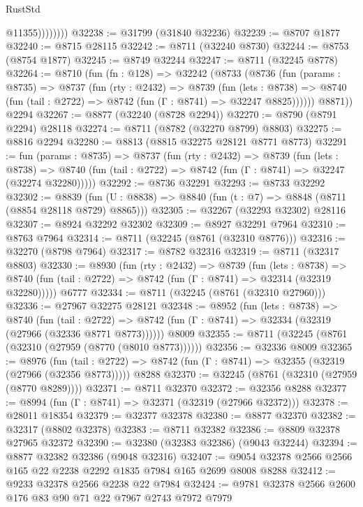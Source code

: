 \begin{lexlean}{RustStd}
\begin{coremodule}
                    @11355))))))))
@32238 := @31799 (@31840 @32236)
@32239 := @8707 @1877
@32240 := @8715 @28115
@32242 := @8711 (@32240 @8730)
@32244 := @8753 (@8754 @1877)
@32245 := @8749 @32244
@32247 := @8711 (@32245 @8778)
@32264 := @8710
    (fun (fn : @128) =>
    @32242
      (@8733
        (@8736
          (fun (params : @8735) =>
          @8737
            (fun (rty : @2432) =>
            @8739
              (fun (lets : @8738) =>
              @8740 (fun (tail : @2722) => @8742 (fun (Γ : @8741) => @32247 @8825))))))
        @8871))
    @2294
@32267 := @8877 (@32240 (@8728 @2294))
@32270 := @8790 (@8791 @2294) @28118
@32274 := @8711 (@8782 (@32270 @8799) @8803)
@32275 := @8816 @2294
@32280 := @8813 (@8815 @32275 @28121 @8771 @8773)
@32291 := fun (params : @8735) =>
  @8737
    (fun (rty : @2432) =>
    @8739
      (fun (lets : @8738) =>
      @8740 (fun (tail : @2722) => @8742 (fun (Γ : @8741) => @32247 (@32274 @32280)))))
@32292 := @8736 @32291
@32293 := @8733 @32292
@32302 := @8839
    (fun (U : @8838) => @8840 (fun (t : @7) => @8848 (@8711 (@8854 @28118 @8729) @8865)))
@32305 := @32267 (@32293 @32302) @28116
@32307 := @8924 @32292 @32302
@32309 := @8927 @32291 @7964
@32310 := @8763 @7964
@32314 := @8711 (@32245 (@8761 (@32310 @8776)))
@32316 := @32270 (@8798 @7964)
@32317 := @8782 @32316
@32319 := @8711 (@32317 @8803)
@32330 := @8930
    (fun (rty : @2432) =>
    @8739
      (fun (lets : @8738) =>
      @8740 (fun (tail : @2722) => @8742 (fun (Γ : @8741) => @32314 (@32319 @32280)))))
    @6777
@32334 := @8711 (@32245 (@8761 (@32310 @27960)))
@32336 := @27967 @32275 @28121
@32348 := @8952
    (fun (lets : @8738) =>
    @8740
      (fun (tail : @2722) =>
      @8742 (fun (Γ : @8741) => @32334 (@32319 (@27966 (@32336 @8771 @8773))))))
    @8009
@32355 := @8711 (@32245 (@8761 (@32310 (@27959 (@8770 (@8010 @8773))))))
@32356 := @32336 @8009
@32365 := @8976
    (fun (tail : @2722) => @8742 (fun (Γ : @8741) => @32355 (@32319 (@27966 (@32356 @8773)))))
    @8288
@32370 := @32245 (@8761 (@32310 (@27959 (@8770 @8289))))
@32371 := @8711 @32370
@32372 := @32356 @8288
@32377 := @8994 (fun (Γ : @8741) => @32371 (@32319 (@27966 @32372)))
@32378 := @28011 @18354
@32379 := @32377 @32378
@32380 := @8877 @32370
@32382 := @32317 (@8802 @32378)
@32383 := @8711 @32382
@32386 := @8809 @32378 @27965 @32372
@32390 := @32380 (@32383 @32386) (@9043 @32244)
@32394 := @8877 @32382 @32386 (@9048 @32316)
@32407 := @9054 @32378 @2566 @2566 @165 @22 @2238 @2292 @1835 @7984 @165 @2699 @8008 @8288
@32412 := @9233 @32378 @2566 @2238 @22 @7984
@32424 := @9781 @32378 @2566 @2600 @176 @83 @90 @71 @22 @7967 @2743 @7972 @7979

\end{coremodule}
\end{lexlean}
